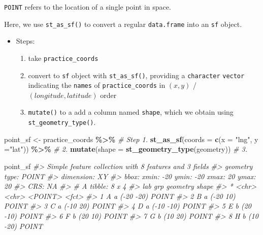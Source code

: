 \documentclass[
]{report}
\newenvironment{Shaded}{\begin{snugshade}}{\end{snugshade}}
\newcommand{\CommentTok}[1]{\textcolor[rgb]{0.56,0.35,0.01}{\textit{#1}}}
\newcommand{\DataTypeTok}[1]{\textcolor[rgb]{0.13,0.29,0.53}{#1}}
\newcommand{\KeywordTok}[1]{\textcolor[rgb]{0.13,0.29,0.53}{\textbf{#1}}}
\newcommand{\NormalTok}[1]{#1}
\newcommand{\OperatorTok}[1]{\textcolor[rgb]{0.81,0.36,0.00}{\textbf{#1}}}
\newcommand{\StringTok}[1]{\textcolor[rgb]{0.31,0.60,0.02}{#1}}
\providecommand{\tightlist}{%
  \setlength{\itemsep}{0pt}\setlength{\parskip}{0pt}}
\begin{document}
\texttt{POINT} refers to the location of a single point in space.

Here, we use \texttt{st\_as\_sf()} to convert a regular \texttt{data.frame} into an \texttt{sf} object.

\begin{itemize}
\tightlist
\item
  Steps:

  \begin{enumerate}
  \def\labelenumi{\arabic{enumi}.}
  \tightlist
  \item
    take \texttt{practice\_coords}
  \item
    convert to \texttt{sf} object with \texttt{st\_as\_sf()}, providing a \texttt{character} \texttt{vector} indicating the \texttt{names} of \texttt{practice\_coords} in \((x, y)\) / \((longitude, latitude)\) order
  \item
    \texttt{mutate()} to a add a column named \texttt{shape}, which we obtain using \texttt{st\_geometry\_type()}.
  \end{enumerate}
\end{itemize}

\begin{Shaded}
\begin{Highlighting}[]
\NormalTok{point\_sf \textless{}{-}}\StringTok{ }\NormalTok{practice\_coords }\OperatorTok{\%\textgreater{}\%}\StringTok{                     }\CommentTok{\# Step 1.}
\StringTok{  }\KeywordTok{st\_as\_sf}\NormalTok{(}\DataTypeTok{coords =} \KeywordTok{c}\NormalTok{(}\DataTypeTok{x =} \StringTok{"lng"}\NormalTok{, }\DataTypeTok{y =}\StringTok{"lat"}\NormalTok{)) }\OperatorTok{\%\textgreater{}\%}\StringTok{     }\CommentTok{\# 2.}
\StringTok{  }\KeywordTok{mutate}\NormalTok{(}\DataTypeTok{shape =} \KeywordTok{st\_geometry\_type}\NormalTok{(geometry))        }\CommentTok{\# 3.}

\NormalTok{point\_sf}
\CommentTok{\#\textgreater{} Simple feature collection with 8 features and 3 fields}
\CommentTok{\#\textgreater{} geometry type:  POINT}
\CommentTok{\#\textgreater{} dimension:      XY}
\CommentTok{\#\textgreater{} bbox:           xmin: {-}20 ymin: {-}20 xmax: 20 ymax: 20}
\CommentTok{\#\textgreater{} CRS:            NA}
\CommentTok{\#\textgreater{} \# A tibble: 8 x 4}
\CommentTok{\#\textgreater{}   lab   grp    geometry shape}
\CommentTok{\#\textgreater{} * \textless{}chr\textgreater{} \textless{}chr\textgreater{}   \textless{}POINT\textgreater{} \textless{}fct\textgreater{}}
\CommentTok{\#\textgreater{} 1 A     a     ({-}20 {-}20) POINT}
\CommentTok{\#\textgreater{} 2 B     a      ({-}20 10) POINT}
\CommentTok{\#\textgreater{} 3 C     a      ({-}10 20) POINT}
\CommentTok{\#\textgreater{} 4 D     a     ({-}10 {-}10) POINT}
\CommentTok{\#\textgreater{} 5 E     b      (20 {-}10) POINT}
\CommentTok{\#\textgreater{} 6 F     b       (20 10) POINT}
\CommentTok{\#\textgreater{} 7 G     b       (10 20) POINT}
\CommentTok{\#\textgreater{} 8 H     b      (10 {-}20) POINT}
\end{Highlighting}
\end{Shaded}
\end{document}
